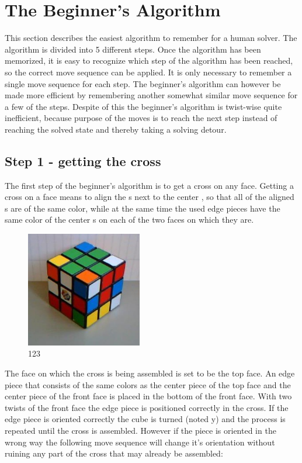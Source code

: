 \section{The Beginner's Algorithm}
\label{sec:beginner}
This section describes the easiest algorithm to remember for a human solver. The algorithm is divided into 5 different steps. Once the algorithm has been memorized, it is easy to recognize which step of the algorithm has been reached, so the correct move sequence can be applied. It is only necessary to remember a single move sequence for each step. The beginner's algorithm can however be made more efficient by remembering another somewhat similar move sequence for a few of the steps. Despite of this the beginner's algorithm is twist-wise quite inefficient, because purpose of the moves is to reach the next step instead of reaching the solved state and thereby taking a solving detour. 

\subsection{Step 1 - getting the cross}
The first step of the beginner's algorithm is to get a cross on any face. Getting a cross on a face means to align the \facelet{}s next to the center \facelet{}, so that all of the aligned \facelet{}s are of the same color, while at the same time the used edge pieces have the same color of the center \facelet{}s on each of the two faces on which they are.

\begin{figure}
\begin{center}
	\includegraphics[width=0.45\textwidth]{input/pics/1FLCross.jpg}	
\end{center}
\caption{123}
\label{fig:1FL-cross}
\end{figure}

The face on which the cross is being assembled is set to be the top face. An edge piece that consists of the same colors as the center piece of the top face and the center piece of the front face is placed in the bottom of the front face. With two twists of the front face the edge piece is positioned correctly in the cross. If the edge piece is oriented correctly the cube is turned (noted y) and the process is repeated until the cross is assembled. However if the piece is oriented in the wrong way the following move sequence will change it's orientation without ruining any part of the cross that may already be assembled: \\

